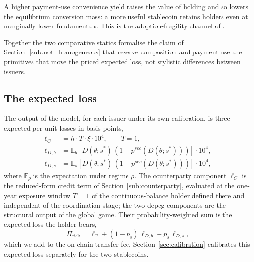 A higher payment-use convenience yield raises the value of holding and so lowers the equilibrium conversion mass: a more useful stablecoin retains holders even at marginally lower fundamentals. This is the adoption-fragility channel of \citet{bertsch_2025_adoption_fragility}.

Together the two comparative statics formalise the claim of Section~\ref{sub:not_homogeneous} that reserve composition and payment use are primitives that move the priced expected loss, not stylistic differences between issuers.

\subsection{The expected loss}\label{sub:what_it_delivers}

The output of the model, for each issuer under its own calibration, is three expected per-unit losses in basis points,
\begin{align}
\ell_C &= h \cdot T \cdot \xi \cdot 10^4, \qquad T = 1,\label{eq:ellC} \\
\ell_{D,b} &= \mathbb{E}_b\!\left[D(\theta; s^*)\,(1 - p^{sec}(D(\theta; s^*)))\right] \cdot 10^4,\label{eq:ellDb} \\
\ell_{D,s} &= \mathbb{E}_s\!\left[D(\theta; s^*)\,(1 - p^{sec}(D(\theta; s^*)))\right] \cdot 10^4,\label{eq:ellDs}
\end{align}
where $\mathbb{E}_\rho$ is the expectation under regime $\rho$. The counterparty component $\ell_C$ is the reduced-form credit term of Section~\ref{sub:counterparty}, evaluated at the one-year exposure window $T=1$ of the continuous-balance holder defined there and independent of the coordination stage; the two depeg components are the structural output of the global game. Their probability-weighted sum is the expected loss the holder bears,
\begin{equation}\label{eq:total_risk_premium}
\Pi_{\text{risk}} = \ell_C + (1-p_s)\,\ell_{D,b} + p_s\,\ell_{D,s},
\end{equation}
which we add to the on-chain transfer fee. Section~\ref{sec:calibration} calibrates this expected loss separately for the two stablecoins.
